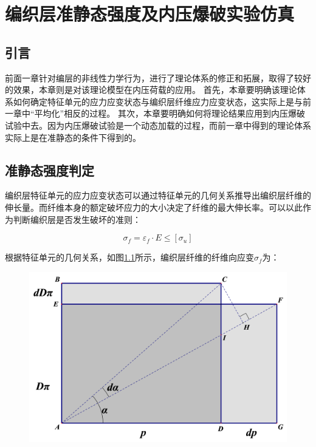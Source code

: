 
\chapter{编织层准静态强度及内压爆破实验仿真}


\section{引言}

前面一章针对编层的非线性力学行为，进行了理论体系的修正和拓展，取得了较好的效果，本章则是对该理论模型在内压荷载的应用。
首先，本章要明确该理论体系如何确定特征单元的应力应变状态与编织层纤维应力应变状态，这实际上是与前一章中“平均化”相反的过程。
其次，本章要明确如何将理论结果应用到内压爆破试验中去。因为内压爆破试验是一个动态加载的过程，而前一章中得到的理论体系实际上是在准静态的条件下得到的。

\section{准静态强度判定}

编织层特征单元的应力应变状态可以通过特征单元的几何关系推导出编织层纤维的伸长量。而纤维本身的额定破坏应力的大小决定了纤维的最大伸长率。可以以此作为判断编织层是否发生破坏的准则：

\begin{equation}
{\sigma _f} = {\varepsilon _f} \cdot E \le \left[ {{\sigma _u}} \right]
\end{equation}

根据特征单元的几何关系，如图\ref{fig:unit-cell-chap6}所示，编织层纤维的纤维向应变$  \sigma _f$为：


\begin{figure}[!htb]
	\centering
	\includegraphics[height=0.25\textheight]{figure/chap5/unit-cell-3}
	\label{fig:unit-cell-chap6}
\end{figure}


